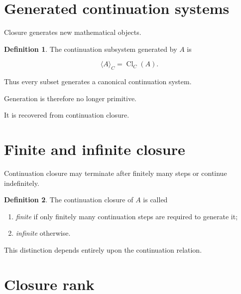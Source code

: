 \documentclass[13pt,openany]{book}
\theoremstyle{plain}
\theoremstyle{definition}
\newtheorem{definition}{Definition}[chapter]
\begin{document}

\section{Generated continuation systems}

Closure generates new mathematical objects.

\begin{definition}

The continuation subsystem generated by \(A\) is

\[
\langle A\rangle_C
=
\operatorname{Cl}_C(A).
\]

\end{definition}

Thus every subset generates a canonical continuation system.

Generation is therefore no longer primitive.

It is recovered from continuation closure.


\section{Finite and infinite closure}

Continuation closure may terminate after finitely many steps or continue
indefinitely.

\begin{definition}

The continuation closure of \(A\) is called

\begin{enumerate}

\item
\emph{finite}
if only finitely many continuation steps are required to generate it;

\item
\emph{infinite}
otherwise.

\end{enumerate}

\end{definition}

This distinction depends entirely upon the continuation relation.


\section{Closure rank}
\end{document}
